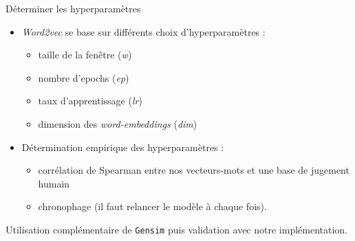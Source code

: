 \documentclass[10pt,xcolor=table,color={dvipsnames,usenames},ignorenonframetext,usepdftitle=false,french]{beamer}
\providecommand{\tightlist}{%
  \setlength{\parskip}{0pt}
  }
\begin{document}
\begin{frame}{Déterminer les hyperparamètres}
\protect\hypertarget{duxe9terminer-les-hyperparamuxe8tres}{}

\begin{itemize}
\tightlist
\item
  \emph{Word2vec} se base sur différents choix d'hyperparamètres :

  \begin{itemize}
  \tightlist
  \item
    taille de la fenêtre (\emph{w})
  \item
    nombre d'epochs (\emph{ep})
  \item
    taux d'apprentissage (\emph{lr})
  \item
    dimension des \emph{word-embeddings} (\emph{dim})
  \end{itemize}
\end{itemize}

\medskip

\begin{itemize}
\tightlist
\item
  Détermination empirique des hyperparamètres :

  \begin{itemize}
  \tightlist
  \item
    corrélation de Spearman entre nos vecteurs-mots et une base de
    jugement humain
  \item
    chronophage (il faut relancer le modèle à chaque fois).
  \end{itemize}
\end{itemize}

\medskip

\faArrowCircleRight{} Utilisation complémentaire de \texttt{Gensim} puis
validation avec notre implémentation.

\end{frame}
\end{document}
